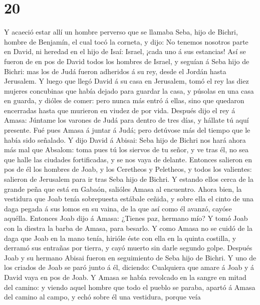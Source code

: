 \hypertarget{section-19}{%
\section{20}\label{section-19}}

 Y acaeció estar allí un hombre perverso que se llamaba
Seba, hijo de Bichri, hombre de Benjamín, el cual tocó la corneta, y
dijo: No tenemos nosotros parte en David, ni heredad en el hijo de Isaí:
Israel, ¡cada uno á sus estancias!  Así se fueron de en
pos de David todos los hombres de Israel, y seguían á Seba hijo de
Bichri: mas los de Judá fueron adheridos á su rey, desde el Jordán hasta
Jerusalem.  Y luego que llegó David á su casa en
Jerusalem, tomó el rey las diez mujeres concubinas que había dejado para
guardar la casa, y púsolas en una casa en guarda, y dióles de comer:
pero nunca más entró á ellas, sino que quedaron encerradas hasta que
murieron en viudez de por vida.  Después dijo el rey á
Amasa: Júntame los varones de Judá para dentro de tres días, y hállate
tú aquí presente.  Fué pues Amasa á juntar á Judá; pero
detúvose más del tiempo que le había sido señalado.  Y
dijo David á Abisai: Seba hijo de Bichri nos hará ahora más mal que
Absalom: toma pues tú los siervos de tu señor, y ve tras él, no sea que
halle las ciudades fortificadas, y se nos vaya de delante.
 Entonces salieron en pos de él los hombres de Joab, y los
Ceretheos y Peletheos, y todos los valientes: salieron de Jerusalem para
ir tras Seba hijo de Bichri.  Y estando ellos cerca de la
grande peña que está en Gabaón, salióles Amasa al encuentro. Ahora bien,
la vestidura que Joab tenía sobrepuesta estábale ceñida, y sobre ella el
cinto de una daga pegada á sus lomos en su vaina, de la que así como él
avanzó, cayóse aquélla.  Entonces Joab dijo á Amasa:
¿Tienes paz, hermano mío? Y tomó Joab con la diestra la barba de Amasa,
para besarlo.  Y como Amasa no se cuidó de la daga que
Joab en la mano tenía, hirióle éste con ella en la quinta costilla, y
derramó sus entrañas por tierra, y cayó muerto sin darle segundo golpe.
Después Joab y su hermano Abisai fueron en seguimiento de Seba hijo de
Bichri.  Y uno de los criados de Joab se paró junto á él,
diciendo: Cualquiera que amare á Joab y á David vaya en pos de Joab.
 Y Amasa se había revolcado en la sangre en mitad del
camino: y viendo aquel hombre que todo el pueblo se paraba, apartó á
Amasa del camino al campo, y echó sobre él una vestidura, porque veía
